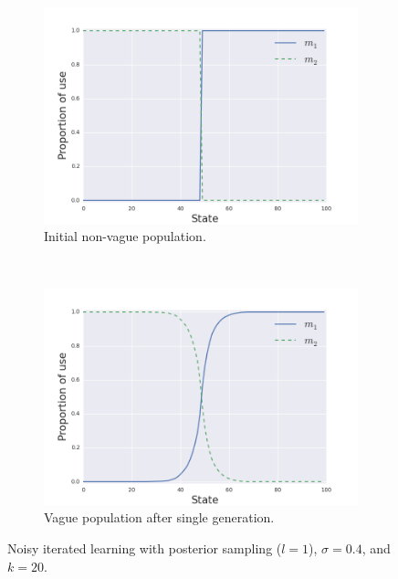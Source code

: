 \documentclass[10pt,a4paper]{article}
\begin{document}
\begin{figure}[ht]
  \centering
  \begin{subfigure}[b]{0.45\textwidth}
    \includegraphics[scale=0.4]{../code/plots/vag-gen0.png}
    \caption{Initial non-vague population.}
    \label{fig:vaga}
  \end{subfigure}
  ~
   \begin{subfigure}[b]{0.45\textwidth}
    \includegraphics[scale=0.4]{../code/plots/vag-gen1.png}
    \caption{Vague population after single generation.}
    \label{fig:vagb}

  \end{subfigure}
  \caption{Noisy iterated learning with posterior sampling ($l=1$), $\sigma = 0.4$, and $k =
    20$.}
  \label{fig:vag}
\end{figure}
 
\end{document}

